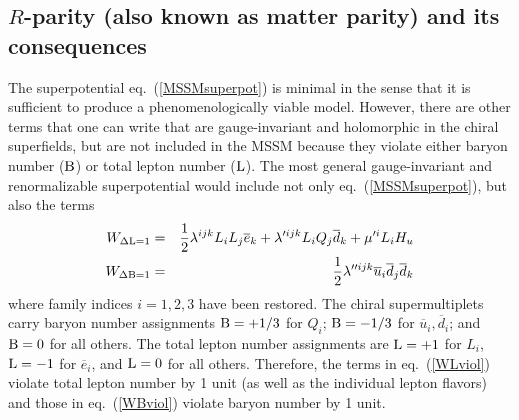 \documentclass[11pt]{article}
\def\beq{\begin{eqnarray}}
\def\eeq{\end{eqnarray}}
\def\Baryon{{\rm B}}
\def\Lepton{{\rm L}}
\def\sbar{\overline}
\begin{document}
\subsection{$R$-parity (also known as matter parity) and its
consequences}\label{subsec:mssm.rparity}
\setcounter{equation}{0}

The superpotential eq.~(\ref{MSSMsuperpot}) is minimal in the sense that
it is sufficient to produce a phenomenologically viable model. However,
there are other terms that one can write that are gauge-invariant
and holomorphic in the chiral superfields, but are not included in the MSSM
because they violate either baryon number ($\Baryon$) or total lepton
number ($\Lepton$). The most general gauge-invariant and renormalizable
superpotential would include not only eq.~(\ref{MSSMsuperpot}), but also
the terms
\beq
W_{\Delta {\rm L} =1} &=&
{1\over 2} \lambda^{ijk} L_iL_j{\sbar e_k}
+ \lambda^{\prime ijk} L_i Q_j {\sbar d_k}
+ \mu^{\prime i} L_i H_u
\label{WLviol} \\
W_{\Delta {\rm B}= 1} &=& {1\over 2} \lambda^{\prime\prime ijk}
{\sbar u_i}{\sbar d_j}{\sbar d_k}
\label{WBviol}
\eeq
where family indices $i=1,2,3$ have been restored. The chiral
supermultiplets carry baryon number assignments $\Baryon=+1/3$ for $Q_i$;
$\Baryon=-1/3$ for $\sbar u_i, \sbar d_i$; and $\Baryon=0$ for all others.
The total lepton number assignments are $\Lepton=+1$ for $L_i$,
$\Lepton=-1$ for $\sbar e_i$, and $\Lepton=0$ for all others. Therefore,
the terms in eq.~(\ref{WLviol}) violate total lepton number by 1 unit (as
well as the individual lepton flavors) and those in eq.~(\ref{WBviol})
violate baryon number by 1 unit. 
\end{document}
